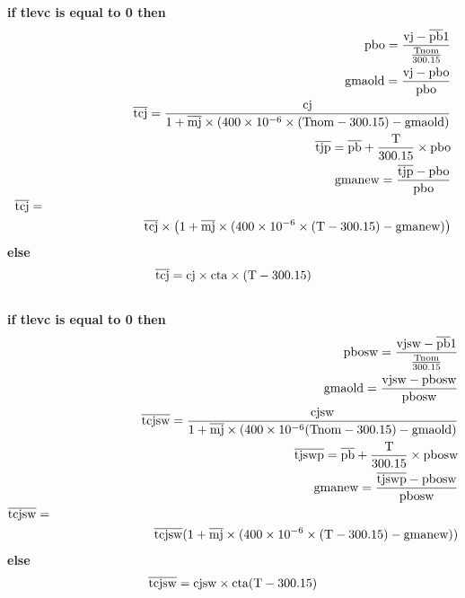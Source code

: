 \noindent\textbf{if tlevc is equal to 0 then}
{\color{darkgray}
\begin{eqnarray}
\rm{pbo = \frac{vj-\overline{pb}1}{\frac{Tnom}{300.15}}}\nonumber \\
\rm{gmaold = \frac{vj-pbo}{pbo}}\nonumber \\
\rm{\overline{tcj} = \frac{cj}{1+\overline{mj}\times(400\times 10^{-6}\times (Tnom-300.15)-gmaold)}}\nonumber \\
\rm{\overline{tjp} = \overline{pb}+\frac{T}{300.15}\times pbo}\nonumber \\
\rm{gmanew = \frac{\overline{tjp}-pbo}{pbo}}\nonumber \\
\rm{\overline{tcj}=  }\hspace{4.5in}\nonumber \\
\rm{\overline{tcj}\times\left(1+\overline{mj}\times
                            (400\times 10^{-6}\times (T-300.15)-gmanew)\right)}\nonumber 
\end{eqnarray}
}
\textbf{else}
{\color{darkgray}
\begin{eqnarray}
\rm{\overline{tcj} = cj\times cta\times (T-300.15)}\nonumber \\
\nonumber 
\end{eqnarray}
}
\textbf{if tlevc is equal to 0 then}
{\color{darkgray}
\begin{eqnarray}
\rm{pbosw = \frac{vjsw-\overline{pb}1}{\frac{Tnom}{300.15}}}\nonumber \\
\rm{gmaold = \frac{vjsw-pbosw}{pbosw}}\nonumber \\
\rm{\overline{tcjsw} = \frac{cjsw}{1+\overline{mj}\times(400\times 10^{-6}(Tnom-300.15)-gmaold)}}\nonumber \\
\rm{\overline{tjswp} = \overline{pb}+\frac{T}{300.15}\times pbosw}\nonumber \\
\rm{gmanew = \frac{\overline{tjswp}-pbosw}{pbosw}}\nonumber \\
\rm{\overline{tcjsw} = }\hspace{4.5in}\nonumber \\
\rm{\overline{tcjsw}(1+\overline{mj}\times
                            (400\times 10^{-6}\times(T-300.15)-gmanew))}\nonumber 
\end{eqnarray}
}
\textbf{else}
{\color{darkgray}
\begin{eqnarray}
\rm{\overline{tcjsw} = cjsw\times cta(T-300.15)}\nonumber
\end{eqnarray}
}


